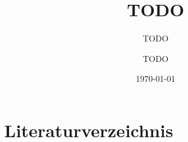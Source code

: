 \documentclass[paper=a4,fontsize=12pt,parskip=half]{scrartcl}
\title{TODO}
\subtitle{TODO}
\author{TODO}
\date{\today{}}
\begin{document}


\cleardoublepage



\cleardoublepage

\tableofcontents{}

\cleardoublepage


\cleardoublepage


\cleardoublepage


\cleardoublepage


\cleardoublepage


\cleardoublepage


\appendix{}

\cleardoublepage



\cleardoublepage

\section{Literaturverzeichnis}
\printbibliography[heading=none]
\end{document}
